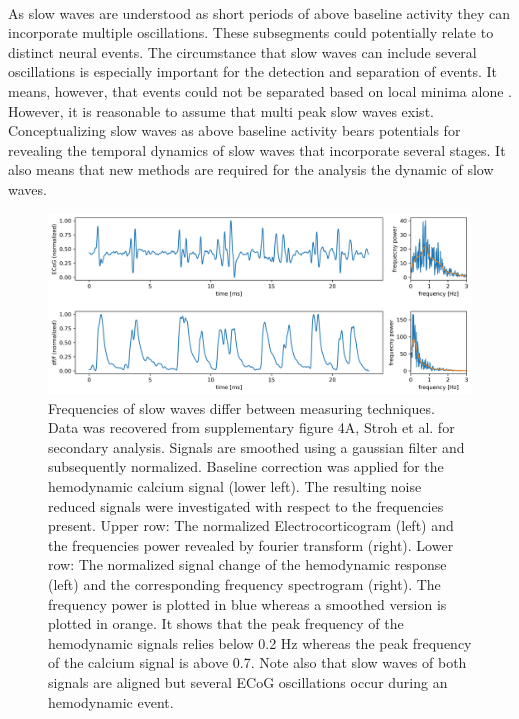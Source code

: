 \\
As slow waves are understood as short periods of above baseline activity they can incorporate multiple oscillations. These subsegments could potentially relate to distinct neural events. The circumstance that slow waves can include several oscillations is especially important for the detection and separation of events. It means, however, that events could not be separated based on local minima alone \parencite{celotto2020analysis}. However, it is reasonable to assume that multi peak slow waves exist. Conceptualizing slow waves as above baseline activity bears potentials for revealing the temporal dynamics of slow waves that incorporate several stages. It also means that new methods are required for the analysis the dynamic of slow waves.

\begin{figure}[th]
\centering
\includegraphics[width=\textwidth,height=\textheight,keepaspectratio]{Figures/ecog_calcium_flourescence}
\decoRule
\caption[Frequencies of slow waves differ between measuring techniques]{Frequencies of slow waves differ between measuring techniques.\\
Data was recovered from supplementary figure 4A, Stroh et al. \parencite*{stroh2013making} for secondary analysis. Signals are smoothed using a gaussian filter and subsequently normalized. Baseline correction was applied for the hemodynamic calcium signal (lower left). The resulting noise reduced signals were investigated with respect to the frequencies present. Upper row: The normalized Electrocorticogram (left) and the frequencies power revealed by fourier transform (right). Lower row: The normalized signal change of the hemodynamic response (left) and the corresponding frequency spectrogram (right). The frequency power is plotted in blue whereas a smoothed version is plotted in orange. It shows that the peak frequency of the hemodynamic signals relies below 0.2 Hz whereas the peak frequency of the calcium signal is above 0.7. Note also that slow waves of both signals are aligned but several ECoG oscillations occur during an hemodynamic event.\\
}
\label{fig:ecog_calcium_flourescence}
\end{figure}
